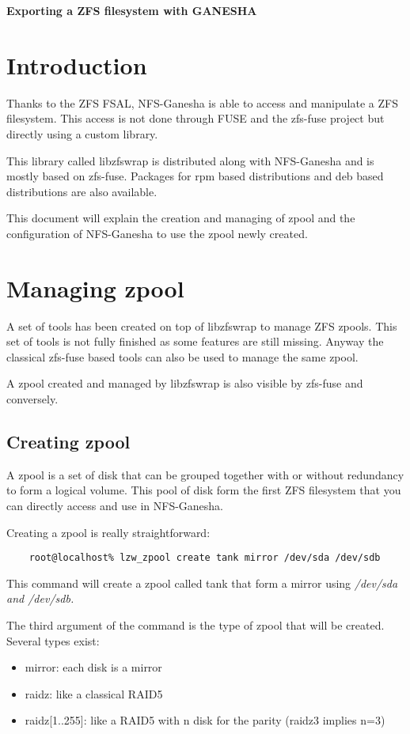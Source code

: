 \documentclass[english]{article}
\begin{document}
{\Large \textbf{Exporting a ZFS filesystem with GANESHA} }\\

\section{Introduction}

Thanks to the ZFS FSAL, NFS-Ganesha is able to access and manipulate a ZFS
filesystem. This access is not done through FUSE and the zfs-fuse project but
directly using a custom library.

This library called libzfswrap is distributed along with NFS-Ganesha and is
mostly based on zfs-fuse. Packages for rpm based distributions and deb based
distributions are also available.

This document will explain the creation and managing of zpool and the
configuration of NFS-Ganesha to use the zpool newly created.

\section{Managing zpool}

A set of tools has been created on top of libzfswrap to manage ZFS zpools. This
set of tools is not fully finished as some features are still missing. Anyway
the classical zfs-fuse based tools can also be used to manage the same zpool.

A zpool created and managed by libzfswrap is also visible by zfs-fuse and
conversely.

\subsection{Creating zpool}

A zpool is a set of disk that can be grouped together with or without
redundancy to form a logical volume. This pool of disk form the first ZFS
filesystem that you can directly access and use in NFS-Ganesha.

Creating a zpool is really straightforward:
\begin{verbatim}
    root@localhost% lzw_zpool create tank mirror /dev/sda /dev/sdb
\end{verbatim}

This command will create a zpool called tank that form a mirror using
\it{/dev/sda} and \it{/dev/sdb}.

The third argument of the command is the type of zpool that will be created.
Several types exist:
\begin{itemize}
    \item mirror: each disk is a mirror
    \item raidz: like a classical RAID5
    \item raidz[1..255]: like a RAID5 with n disk for the parity (raidz3 implies n=3)
\end{itemize}
\end{document}
